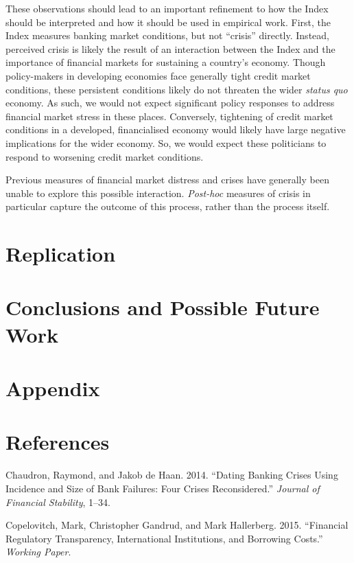 \documentclass[]{article}
\begin{document}
These observations should lead to an important refinement to how the
Index should be interpreted and how it should be used in empirical work.
First, the Index measures banking market conditions, but not ``crisis''
directly. Instead, perceived crisis is likely the result of an
interaction between the Index and the importance of financial markets
for sustaining a country's economy. Though policy-makers in developing
economies face generally tight credit market conditions, these
persistent conditions likely do not threaten the wider \emph{status quo}
economy. As such, we would not expect significant policy responses to
address financial market stress in these places. Conversely, tightening
of credit market conditions in a developed, financialised economy would
likely have large negative implications for the wider economy. So, we
would expect these politicians to respond to worsening credit market
conditions.

Previous measures of financial market distress and crises have generally
been unable to explore this possible interaction. \emph{Post-hoc}
measures of crisis in particular capture the outcome of this process,
rather than the process itself.

\section{Replication}\label{replication}

\section{Conclusions and Possible Future
Work}\label{conclusions-and-possible-future-work}

\section{Appendix}\label{appendix}

\section*{References}\label{references}

Chaudron, Raymond, and Jakob de Haan. 2014. ``Dating Banking Crises
Using Incidence and Size of Bank Failures: Four Crises Reconsidered.''
\emph{Journal of Financial Stability}, 1--34.

Copelovitch, Mark, Christopher Gandrud, and Mark Hallerberg. 2015.
``Financial Regulatory Transparency, International Institutions, and
Borrowing Costs.'' \emph{Working Paper}.
\end{document}
